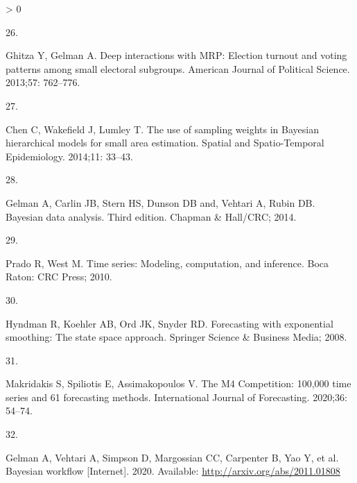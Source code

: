 \documentclass[10pt,letterpaper]{article}
\newlength{\csllabelwidth}
\newlength{\cslhangindent}
\newenvironment{CSLReferences}[2] %
 {%
  \setlength{\parindent}{0pt}
  \ifodd #1 \everypar{\setlength{\hangindent}{\cslhangindent}}\ignorespaces\fi
  \ifnum #2 > 0
  \setlength{\parskip}{#2\baselineskip}
  \fi
 }%
 {}
\newcommand{\CSLLeftMargin}[1]{\parbox[t]{\csllabelwidth}{#1}}
\newcommand{\CSLRightInline}[1]{\parbox[t]{\linewidth - \csllabelwidth}{#1}\break}
\begin{document}
\begin{CSLReferences}{0}{0}
\leavevmode\hypertarget{ref-ghitza2013deep}{}%
\CSLLeftMargin{26. }
\CSLRightInline{Ghitza Y, Gelman A. Deep interactions with {MRP}:
Election turnout and voting patterns among small electoral subgroups.
American Journal of Political Science. 2013;57: 762--776. }

\leavevmode\hypertarget{ref-chen2014use}{}%
\CSLLeftMargin{27. }
\CSLRightInline{Chen C, Wakefield J, Lumley T. The use of sampling
weights in {B}ayesian hierarchical models for small area estimation.
Spatial and Spatio-Temporal Epidemiology. 2014;11: 33--43. }

\leavevmode\hypertarget{ref-gelman2014bayesian}{}%
\CSLLeftMargin{28. }
\CSLRightInline{Gelman A, Carlin JB, Stern HS, Dunson DB and, Vehtari A,
Rubin DB. Bayesian data analysis. Third edition. Chapman \& Hall/CRC;
2014. }

\leavevmode\hypertarget{ref-prado2010time}{}%
\CSLLeftMargin{29. }
\CSLRightInline{Prado R, West M. Time series: Modeling, computation, and
inference. Boca Raton: CRC Press; 2010. }

\leavevmode\hypertarget{ref-hyndman2008forecasting}{}%
\CSLLeftMargin{30. }
\CSLRightInline{Hyndman R, Koehler AB, Ord JK, Snyder RD. Forecasting
with exponential smoothing: The state space approach. Springer Science
\& Business Media; 2008. }

\leavevmode\hypertarget{ref-makridakis2020m4}{}%
\CSLLeftMargin{31. }
\CSLRightInline{Makridakis S, Spiliotis E, Assimakopoulos V. The {M4
Competition}: 100,000 time series and 61 forecasting methods.
International Journal of Forecasting. 2020;36: 54--74. }

\leavevmode\hypertarget{ref-gelman2020bayesian}{}%
\CSLLeftMargin{32. }
\CSLRightInline{Gelman A, Vehtari A, Simpson D, Margossian CC, Carpenter
B, Yao Y, et al. Bayesian workflow {[}Internet{]}. 2020. Available:
\url{http://arxiv.org/abs/2011.01808}}

\end{CSLReferences}

\nolinenumbers
\end{document}
